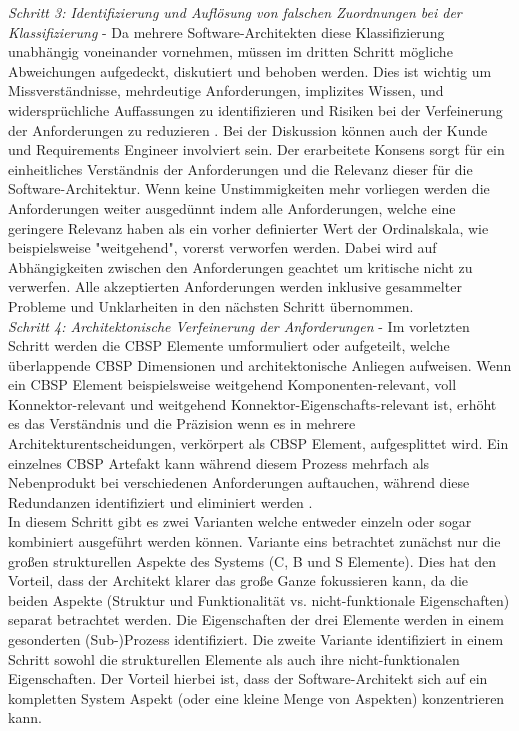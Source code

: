 \emph{Schritt 3: Identifizierung und Aufl\"osung von falschen Zuordnungen bei der Klassifizierung} - 
Da mehrere Software-Architekten diese Klassifizierung unabh\"angig voneinander vornehmen, m\"ussen im dritten Schritt m\"ogliche Abweichungen aufgedeckt, diskutiert und behoben werden. Dies ist wichtig um Missverst\"andnisse, mehrdeutige Anforderungen, implizites Wissen, und widerspr\"uchliche Auffassungen zu identifizieren und Risiken bei der Verfeinerung der Anforderungen zu reduzieren \cite{Gru01}. Bei der Diskussion k\"onnen auch der Kunde und Requirements Engineer involviert sein. Der erarbeitete Konsens sorgt f\"ur ein einheitliches Verst\"andnis der Anforderungen und die Relevanz dieser f\"ur die Software-Architektur. Wenn keine Unstimmigkeiten mehr vorliegen werden die Anforderungen weiter ausged\"unnt indem alle Anforderungen, welche eine geringere Relevanz haben als ein vorher definierter Wert der Ordinalskala, wie beispielsweise "weitgehend", vorerst verworfen werden. Dabei wird auf Abh\"angigkeiten zwischen den Anforderungen geachtet um kritische nicht zu verwerfen. Alle akzeptierten Anforderungen werden inklusive gesammelter Probleme und Unklarheiten in den n\"achsten Schritt \"ubernommen. \\

\emph{Schritt 4: Architektonische Verfeinerung der Anforderungen} - 
Im vorletzten Schritt werden die CBSP Elemente umformuliert oder aufgeteilt, welche \"uberlappende CBSP Dimensionen und architektonische Anliegen aufweisen. Wenn ein CBSP Element beispielsweise weitgehend Komponenten-relevant, voll Konnektor-relevant und weitgehend Konnektor-Eigenschafts-relevant ist, erh\"oht es das Verst\"andnis und die Pr\"azision wenn es in mehrere Architekturentscheidungen, verk\"orpert als CBSP Element, aufgesplittet wird. Ein einzelnes CBSP Artefakt kann w\"ahrend diesem Prozess mehrfach als Nebenprodukt bei verschiedenen Anforderungen auftauchen, w\"ahrend diese Redundanzen identifiziert und eliminiert werden \cite{Gru01}. \\

In diesem Schritt gibt es zwei Varianten welche entweder einzeln oder sogar kombiniert ausgef\"uhrt werden k\"onnen. Variante eins betrachtet zun\"achst nur die gro\ss{}en strukturellen Aspekte des Systems (C, B und S Elemente). Dies hat den Vorteil, dass der Architekt klarer das gro\ss{}e Ganze fokussieren kann, da die beiden Aspekte (Struktur und Funktionalit\"at vs. nicht-funktionale Eigenschaften) separat betrachtet werden. Die Eigenschaften der drei Elemente werden in einem gesonderten (Sub-)Prozess identifiziert. Die zweite Variante identifiziert in einem Schritt sowohl die strukturellen Elemente als auch ihre nicht-funktionalen Eigenschaften. Der Vorteil hierbei ist, dass der Software-Architekt sich auf ein kompletten System Aspekt (oder eine kleine Menge von Aspekten) konzentrieren kann. \\

